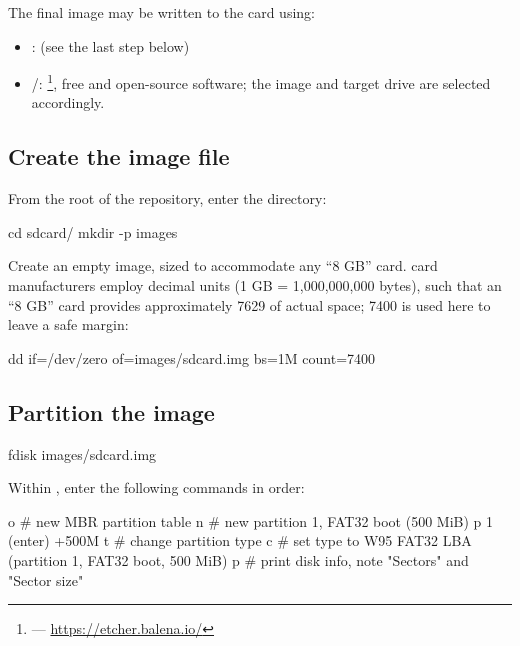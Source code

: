 The final image may be written to the  card using:

\begin{itemize}
    \item {}:  (see the last step below)
    \item {}/: \footnote{ --- \url{https://etcher.balena.io/}}, free and open-source software; the image and target drive are selected accordingly.
\end{itemize}

\subsection{Create the image file}

From the root of the repository, enter the  directory:

\begin{shellcodehost}
cd sdcard/
mkdir -p images
\end{shellcodehost}

Create an empty image, sized to accommodate any ``8 GB''  card.  card manufacturers employ decimal units (1 GB = 1{,}000{,}000{,}000 bytes), such that an ``8 GB'' card provides approximately 7629  of actual space; 7400  is used here to leave a safe margin:

\begin{shellcodehost}
dd if=/dev/zero of=images/sdcard.img bs=1M count=7400
\end{shellcodehost}

\subsection{Partition the image}

\begin{shellcodehost}
fdisk images/sdcard.img
\end{shellcodehost}

Within , enter the following commands in order:

\begin{shellcodehost}
o       # new MBR partition table
n       # new partition 1, FAT32 boot (500 MiB)
p       
1
(enter)
+500M
t       # change partition type
c       # set type to W95 FAT32 LBA (partition 1, FAT32 boot, 500 MiB)
p       # print disk info, note "Sectors" and "Sector size"
\end{shellcodehost}

